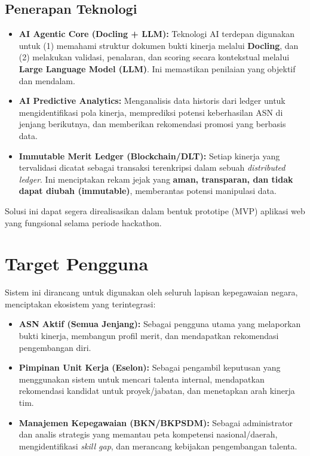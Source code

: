 \documentclass[11pt, a4paper]{article}
\begin{document}
\subsection{Penerapan Teknologi}
\begin{itemize}
    \item \textbf{AI Agentic Core (Docling + LLM):} Teknologi AI terdepan digunakan untuk (1) memahami struktur dokumen bukti kinerja melalui \textbf{Docling}, dan (2) melakukan validasi, penalaran, dan scoring secara kontekstual melalui \textbf{Large Language Model (LLM)}. Ini memastikan penilaian yang objektif dan mendalam.
    \item \textbf{AI Predictive Analytics:} Menganalisis data historis dari ledger untuk mengidentifikasi pola kinerja, memprediksi potensi keberhasilan ASN di jenjang berikutnya, dan memberikan rekomendasi promosi yang berbasis data.
    \item \textbf{Immutable Merit Ledger (Blockchain/DLT):} Setiap kinerja yang tervalidasi dicatat sebagai transaksi terenkripsi dalam sebuah \textit{distributed ledger}. Ini menciptakan rekam jejak yang \textbf{aman, transparan, dan tidak dapat diubah (immutable)}, memberantas potensi manipulasi data.
\end{itemize}
Solusi ini dapat segera direalisasikan dalam bentuk prototipe (MVP) aplikasi web yang fungsional selama periode hackathon.

\section{Target Pengguna}
Sistem ini dirancang untuk digunakan oleh seluruh lapisan kepegawaian negara, menciptakan ekosistem yang terintegrasi:
\begin{itemize}
    \item \textbf{ASN Aktif (Semua Jenjang):} Sebagai pengguna utama yang melaporkan bukti kinerja, membangun profil merit, dan mendapatkan rekomendasi pengembangan diri.
    \item \textbf{Pimpinan Unit Kerja (Eselon):} Sebagai pengambil keputusan yang menggunakan sistem untuk mencari talenta internal, mendapatkan rekomendasi kandidat untuk proyek/jabatan, dan menetapkan arah kinerja tim.
    \item \textbf{Manajemen Kepegawaian (BKN/BKPSDM):} Sebagai administrator dan analis strategis yang memantau peta kompetensi nasional/daerah, mengidentifikasi \textit{skill gap}, dan merancang kebijakan pengembangan talenta.
\end{itemize}
\end{document}

